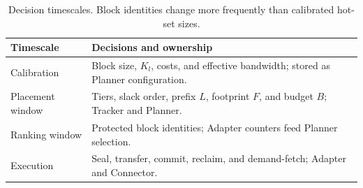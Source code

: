 \begin{table}[t]
  \caption{Decision timescales. Block identities change more frequently
    than calibrated hot-set sizes.}
  \label{tab:design-timescales}
  \centering
  \begin{tabularx}{\columnwidth}{@{}lX@{}}
    \toprule
    Timescale & Decisions and ownership \\
    \midrule
    Calibration & Block size, $K_l$, costs, and effective bandwidth;
      stored as Planner configuration. \\
    Placement window & Tiers, slack order, prefix $L$, footprint $F$,
      and budget $B$; Tracker and Planner. \\
    Ranking window & Protected block identities; Adapter counters
      feed Planner selection. \\
    Execution & Seal, transfer, commit, reclaim, and demand-fetch;
      Adapter and Connector. \\
    \bottomrule
  \end{tabularx}
\end{table}
